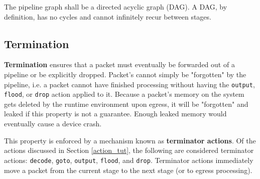 The pipeline graph shall be a directed acyclic graph (DAG). A DAG, by definition, has no cycles and cannot infinitely recur between stages.

%
%

\subsection{Termination} \label{termination_guide}

\textbf{Termination} ensures that a packet must eventually be forwarded out of a pipeline or be explicitly dropped. Packet's cannot simply be "forgotten" by the pipeline, i.e. a packet cannot have finished processing without having the \texttt{output}, \texttt{flood}, or \texttt{drop} action applied to it. Because a packet's memory on the system gets deleted by the runtime environment upon egress, it will be "forgotten" and leaked if this property is not a guarantee. Enough leaked memory would eventually cause a device crash.

This property is enforced by a mechanism known as \textbf{terminator actions}. Of the actions discussed in Section \ref{action_tut}, the following are considered terminator actions: \texttt{decode}, \texttt{goto}, \texttt{output}, \texttt{flood}, and \texttt{drop}. Terminator actions immediately move a packet from the current stage to the next stage (or to egress processing). 


